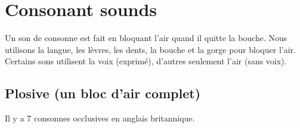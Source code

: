 \chapter{Consonant sounds}\label{chap:conson}
Un son de consonne est fait en bloquant l'air quand il quitte la bouche. Nous utilisons la langue, les lèvres, les dents, la bouche et la gorge pour bloquer l'air. Certains sons utilisent la voix (exprimé), d'autres seulement l'air (sans voix).
\section{Plosive (un bloc d'air complet)}\label{sec:plosive}
Il y a 7 consonnes occlusives en anglais britannique.  
\subsection{ }\label{sec:p}


